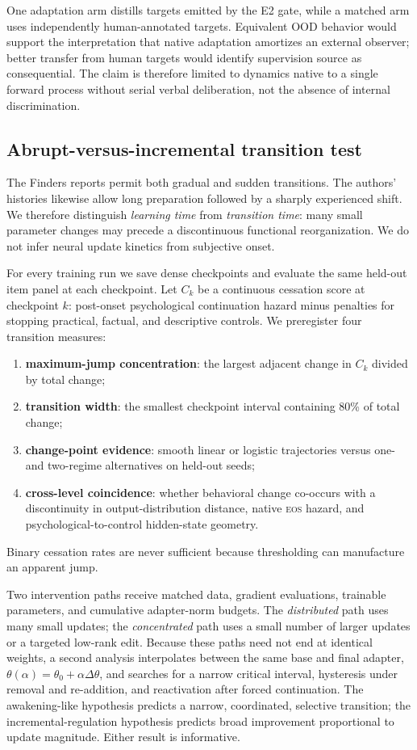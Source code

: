 \documentclass[10pt,twocolumn]{article}
\newcommand{\EOS}{\textsc{eos}}
\begin{document}
One adaptation arm distills targets emitted by the E2 gate, while a matched arm
uses independently human-annotated targets. Equivalent OOD behavior would support
the interpretation that native adaptation amortizes an external observer; better
transfer from human targets would identify supervision source as consequential.
The claim is therefore limited to dynamics native to a single forward process
without serial verbal deliberation, not the absence of internal discrimination.

\subsection{Abrupt-versus-incremental transition test}

The Finders reports permit both gradual and sudden transitions. The authors'
histories likewise allow long preparation followed by a sharply experienced
shift. We therefore distinguish \emph{learning time} from \emph{transition
time}: many small parameter changes may precede a discontinuous functional
reorganization. We do not infer neural update kinetics from subjective onset.

For every training run we save dense checkpoints and evaluate the same held-out
item panel at each checkpoint. Let $C_k$ be a continuous cessation score at
checkpoint $k$: post-onset psychological continuation hazard minus penalties for
stopping practical, factual, and descriptive controls. We preregister four
transition measures:
\begin{enumerate}
    \item \textbf{maximum-jump concentration}: the largest adjacent change
    in $C_k$ divided by total change;
    \item \textbf{transition width}: the smallest checkpoint interval
    containing 80\% of total change;
    \item \textbf{change-point evidence}: smooth linear or logistic
    trajectories versus one- and two-regime alternatives on held-out seeds;
    \item \textbf{cross-level coincidence}: whether behavioral change
    co-occurs with a discontinuity in output-distribution distance, native
    \EOS{} hazard, and psychological-to-control hidden-state geometry.
\end{enumerate}
Binary cessation rates are never sufficient because thresholding can manufacture
an apparent jump.

Two intervention paths receive matched data, gradient evaluations, trainable
parameters, and cumulative adapter-norm budgets. The \emph{distributed} path
uses many small updates; the \emph{concentrated} path uses a small number of
larger updates or a targeted low-rank edit. Because these paths need not end at
identical weights, a second analysis interpolates between the same base and final
adapter, $\theta(\alpha)=\theta_0+\alpha\Delta\theta$, and searches for a
narrow critical interval, hysteresis under removal and re-addition, and
reactivation after forced continuation. The awakening-like hypothesis predicts a
narrow, coordinated, selective transition; the incremental-regulation hypothesis
predicts broad improvement proportional to update magnitude. Either result is
informative.
\end{document}
